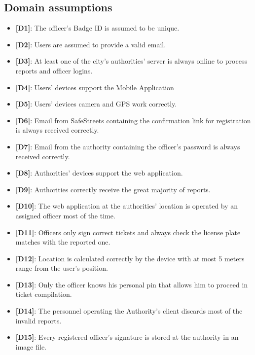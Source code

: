 \documentclass[12pt,a4paper]{article}
\begin{document}
\subsection{Domain assumptions} 
\begin{itemize}
\item {\textbf[}\textbf{D1}{\textbf]}: The officer's Badge ID is assumed to be unique.
\item {\textbf[}\textbf{D2}{\textbf]}: Users are assumed to provide a valid email.
\item {\textbf[}\textbf{D3}{\textbf]}: At least one of the city's authorities' server is always online to process reports and officer logins.
\item {\textbf[}\textbf{D4}{\textbf]}: Users' devices support the Mobile Application 
\item {\textbf[}\textbf{D5}{\textbf]}: Users' devices camera and GPS work correctly.
\item {\textbf[}\textbf{D6}{\textbf]}: Email from SafeStreets containing the confirmation link for registration is always received correctly.
\item {\textbf[}\textbf{D7}{\textbf]}: Email from the authority containing the officer's password is always received correctly.
\item {\textbf[}\textbf{D8}{\textbf]}: Authorities' devices support the web application.
\item {\textbf[}\textbf{D9}{\textbf]}: Authorities correctly receive the great majority of reports.
\item {\textbf[}\textbf{D10}{\textbf]}: The web application at the authorities' location is operated by an assigned officer most of the time.
\item {\textbf[}\textbf{D11}{\textbf]}: Officers only sign correct tickets and always check the license plate matches with the reported one.
\item {\textbf[}\textbf{D12}{\textbf]}: Location is calculated correctly by the device with at most 5 meters range from the user's position.
\item {\textbf[}\textbf{D13}{\textbf]}: Only the officer knows his personal pin that allows him to proceed in ticket compilation.
\item {\textbf[}\textbf{D14}{\textbf]}: The personnel operating the Authority's client discards most of the invalid reports.
\item {\textbf[}\textbf{D15}{\textbf]}: Every registered officer's signature is stored at the authority in an image file.
\end{itemize}
\newpage
\end{document}
